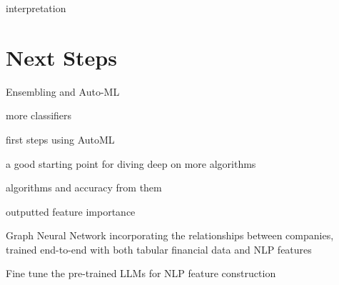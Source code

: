 \documentclass{article}[11pt]
\begin{document}
    interpretation

    \section*{Next Steps}

    Ensembling and Auto-ML

    more classifiers
    
    first steps using AutoML


    a good starting point for diving deep on more algorithms

    algorithms and accuracy from them

    outputted feature importance

    Graph Neural Network incorporating the relationships between companies, trained end-to-end with both tabular financial data and NLP features
    

    Fine tune the pre-trained LLMs for NLP feature construction
    
    \clearpage
    \newpage

    
    



\end{document}
